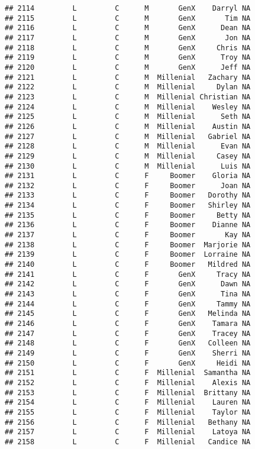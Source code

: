 \documentclass[
]{article}
\begin{document}
\begin{verbatim}
## 2114         L         C      M       GenX    Darryl NA
## 2115         L         C      M       GenX       Tim NA
## 2116         L         C      M       GenX      Dean NA
## 2117         L         C      M       GenX       Jon NA
## 2118         L         C      M       GenX     Chris NA
## 2119         L         C      M       GenX      Troy NA
## 2120         L         C      M       GenX      Jeff NA
## 2121         L         C      M  Millenial   Zachary NA
## 2122         L         C      M  Millenial     Dylan NA
## 2123         L         C      M  Millenial Christian NA
## 2124         L         C      M  Millenial    Wesley NA
## 2125         L         C      M  Millenial      Seth NA
## 2126         L         C      M  Millenial    Austin NA
## 2127         L         C      M  Millenial   Gabriel NA
## 2128         L         C      M  Millenial      Evan NA
## 2129         L         C      M  Millenial     Casey NA
## 2130         L         C      M  Millenial      Luis NA
## 2131         L         C      F     Boomer    Gloria NA
## 2132         L         C      F     Boomer      Joan NA
## 2133         L         C      F     Boomer   Dorothy NA
## 2134         L         C      F     Boomer   Shirley NA
## 2135         L         C      F     Boomer     Betty NA
## 2136         L         C      F     Boomer    Dianne NA
## 2137         L         C      F     Boomer       Kay NA
## 2138         L         C      F     Boomer  Marjorie NA
## 2139         L         C      F     Boomer  Lorraine NA
## 2140         L         C      F     Boomer   Mildred NA
## 2141         L         C      F       GenX     Tracy NA
## 2142         L         C      F       GenX      Dawn NA
## 2143         L         C      F       GenX      Tina NA
## 2144         L         C      F       GenX     Tammy NA
## 2145         L         C      F       GenX   Melinda NA
## 2146         L         C      F       GenX    Tamara NA
## 2147         L         C      F       GenX    Tracey NA
## 2148         L         C      F       GenX   Colleen NA
## 2149         L         C      F       GenX    Sherri NA
## 2150         L         C      F       GenX     Heidi NA
## 2151         L         C      F  Millenial  Samantha NA
## 2152         L         C      F  Millenial    Alexis NA
## 2153         L         C      F  Millenial  Brittany NA
## 2154         L         C      F  Millenial    Lauren NA
## 2155         L         C      F  Millenial    Taylor NA
## 2156         L         C      F  Millenial   Bethany NA
## 2157         L         C      F  Millenial    Latoya NA
## 2158         L         C      F  Millenial   Candice NA

\end{verbatim}
\end{document}
